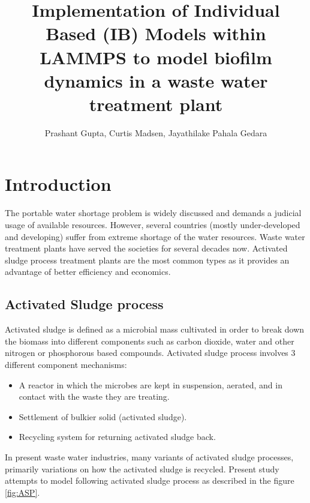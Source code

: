 \documentclass[11pt,a4paper,openright]{article}
\begin{document}
%
\title{Implementation of Individual Based (IB) Models within LAMMPS to model biofilm dynamics in a waste water treatment plant}
\author{Prashant Gupta, Curtis Madsen, Jayathilake Pahala Gedara}

\maketitle



\tableofcontents

\listoftables
\listoffigures


\cleardoublepage
\setcounter{page}{1}

\section{Introduction}

The portable water shortage problem is widely discussed and demands a judicial usage of available resources. However, several countries (mostly under-developed and developing) suffer from extreme shortage of the water resources. Waste water treatment plants have served the societies for several decades now. Activated sludge process treatment plants are the most common types as it provides an advantage of better efficiency and economics.

\subsection{Activated Sludge process}

Activated sludge is defined as a microbial mass cultivated in order to break down the biomass into different components such as carbon dioxide, water and other nitrogen or phosphorous based compounds. Activated sludge process involves 3 different component mechanisms:

\begin{itemize}
\item A reactor in which the microbes are kept in suspension, aerated, and in contact with the waste they are treating.
\item Settlement of bulkier solid (activated sludge).
\item Recycling system for returning activated sludge back. 
\end{itemize}

In present waste water industries, many variants of activated sludge processes, primarily variations on how the activated sludge is recycled. Present study attempts to model following activated sludge process as described in the figure \ref{fig:ASP}.
\end{document}
